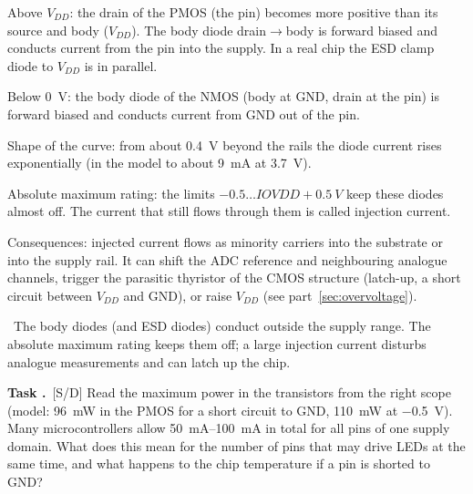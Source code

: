 \documentclass[a4paper,11pt]{article}
\newcounter{task}[section]
\renewcommand{\thetask}{\thesection.\arabic{task}}
\newcommand{\task}[1]{\par\medskip\refstepcounter{task}%
  {\sffamily\bfseries\color{rwuviolet}Task \thetask}\ {\sffamily\small\color{rwucyandark}[#1]}\quad}
\newenvironment{solution}{\begin{solbox}}{\end{solbox}}
\newcommand{\answer}{\par\smallskip{\sffamily\bfseries\color{rwuviolet}Answer:}\ }
\begin{document}
\begin{solution}
\begin{steps}
  \item Above $V_{DD}$: the drain of the PMOS (the pin) becomes more positive than its source and body
        ($V_{DD}$). The body diode drain$\rightarrow$body is forward biased and conducts current from the pin
        into the supply. In a real chip the ESD clamp diode to $V_{DD}$ is in parallel.
  \item Below \SI{0}{V}: the body diode of the NMOS (body at GND, drain at the pin) is forward biased and
        conducts current from GND out of the pin.
  \item Shape of the curve: from about \SI{0.4}{V} beyond the rails the diode current rises exponentially
        (in the model to about \SI{9}{mA} at \SI{3.7}{V}).
  \item Absolute maximum rating: the limits $-0.5\ldots IOVDD+\SI{0.5}{V}$ keep these diodes almost off. The
        current that still flows through them is called injection current.
  \item Consequences: injected current flows as minority carriers into the substrate or into the supply rail.
        It can shift the ADC reference and neighbouring analogue channels, trigger the parasitic thyristor of
        the CMOS structure (latch-up, a short circuit between $V_{DD}$ and GND), or raise $V_{DD}$ (see
        part~\ref{sec:overvoltage}).
\end{steps}
\answer The body diodes (and ESD diodes) conduct outside the supply range. The absolute maximum rating keeps
them off; a large injection current disturbs analogue measurements and can latch up the chip.
\end{solution}

\task{S/D} Read the maximum power in the transistors from the right scope (model: \SI{96}{mW} in the PMOS for a
short circuit to GND, \SI{110}{mW} at \SI{-0.5}{V}). Many microcontrollers allow \SIrange{50}{100}{mA} in total for
all pins of one supply domain. What does this mean for the number of pins that may drive LEDs at the same time,
and what happens to the chip temperature if a pin is shorted to GND?
\end{document}
